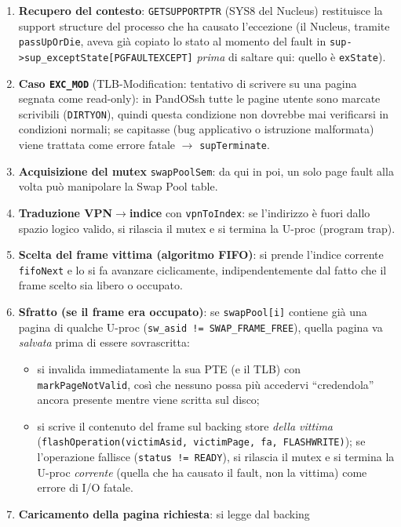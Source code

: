 \documentclass[11pt,a4paper]{article}
\newcommand{\code}[1]{\texttt{#1}}
\begin{document}
\begin{enumerate}
\item \textbf{Recupero del contesto}: \code{GETSUPPORTPTR} (SYS8 del
  Nucleus) restituisce la support structure del processo che ha causato
  l'eccezione (il Nucleus, tramite \code{passUpOrDie}, aveva già copiato lo
  stato al momento del fault in \code{sup->sup\_exceptState[PGFAULTEXCEPT]}
  \emph{prima} di saltare qui: quello è \code{exState}).
\item \textbf{Caso \code{EXC\_MOD}} (TLB-Modification: tentativo di scrivere
  su una pagina segnata come read-only): in PandOSsh tutte le pagine utente
  sono marcate scrivibili (\code{DIRTYON}), quindi questa condizione non
  dovrebbe mai verificarsi in condizioni normali; se capitasse (bug applicativo
  o istruzione malformata) viene trattata come errore fatale $\to$
  \code{supTerminate}.
\item \textbf{Acquisizione del mutex} \code{swapPoolSem}: da qui in poi, un
  solo page fault alla volta può manipolare la Swap Pool table.
\item \textbf{Traduzione VPN$\to$indice} con \code{vpnToIndex}: se
  l'indirizzo è fuori dallo spazio logico valido, si rilascia il mutex e si
  termina la U-proc (program trap).
\item \textbf{Scelta del frame vittima (algoritmo FIFO)}: si prende
  l'indice corrente \code{fifoNext} e lo si fa avanzare ciclicamente,
  indipendentemente dal fatto che il frame scelto sia libero o occupato.
\item \textbf{Sfratto (se il frame era occupato)}: se \code{swapPool[i]}
  contiene già una pagina di qualche U-proc (\code{sw\_asid !=
  SWAP\_FRAME\_FREE}), quella pagina va \emph{salvata} prima di essere
  sovrascritta:
  \begin{itemize}
  \item si invalida immediatamente la sua PTE (e il TLB) con
    \code{markPageNotValid}, così che nessuno possa più accedervi
    ``credendola'' ancora presente mentre viene scritta sul disco;
  \item si scrive il contenuto del frame sul backing store \emph{della
    vittima} (\code{flashOperation(victimAsid, victimPage, fa,
    FLASHWRITE)}); se l'operazione fallisce (\code{status != READY}), si
    rilascia il mutex e si termina la U-proc \emph{corrente} (quella che ha
    causato il fault, non la vittima) come errore di I/O fatale.
  \end{itemize}
\item \textbf{Caricamento della pagina richiesta}: si legge dal backing

\end{enumerate}
\end{document}
